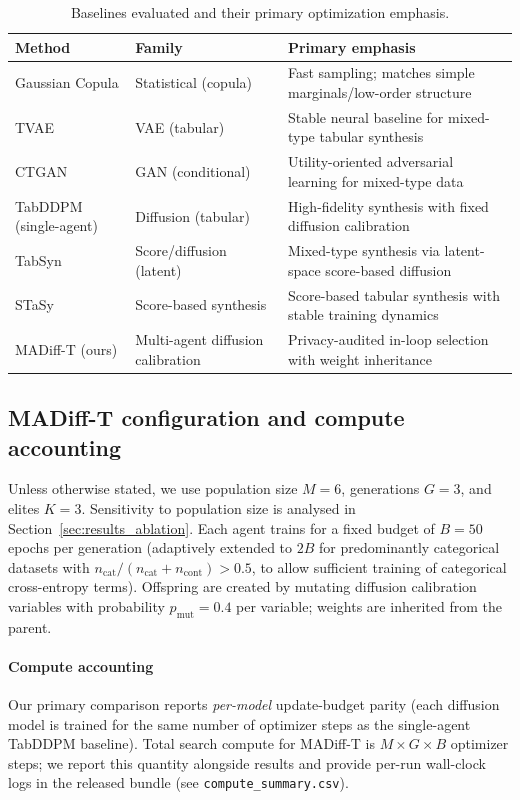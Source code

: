 \documentclass[preprint,12pt]{elsarticle}
\begin{document}
\begin{table}[t]
\centering
\caption{Baselines evaluated and their primary optimization emphasis.}
\label{tab:baselines}
\small
\setlength{\tabcolsep}{6pt}
\renewcommand{\arraystretch}{1.12}
\begin{tabular}{p{3.6cm} p{3.0cm} p{6.0cm}}
\toprule
\rowcolor{tablehead}
\textbf{Method} & \textbf{Family} & \textbf{Primary emphasis} \\
\midrule
Gaussian Copula \cite{Patki2016} & Statistical (copula) & Fast sampling; matches simple marginals/low-order structure \\
TVAE \cite{Xu2019b} & VAE (tabular) & Stable neural baseline for mixed-type tabular synthesis \\
CTGAN \cite{Xu2019a} & GAN (conditional) & Utility-oriented adversarial learning for mixed-type data \\
TabDDPM (single-agent) \cite{Kotelnikov2023} & Diffusion (tabular) & High-fidelity synthesis with fixed diffusion calibration \\
TabSyn \cite{Zhang2024} & Score/diffusion (latent) & Mixed-type synthesis via latent-space score-based diffusion \\
STaSy \cite{Kim2023} & Score-based synthesis & Score-based tabular synthesis with stable training dynamics \\
MADiff-T (ours) & Multi-agent diffusion calibration & Privacy-audited in-loop selection with weight inheritance \\
\bottomrule
\end{tabular}
\end{table}

\subsection{MADiff-T configuration and compute accounting}
Unless otherwise stated, we use population size $M=6$, generations 
$G=3$, and elites $K=3$. Sensitivity to population size is 
analysed in Section~\ref{sec:results_ablation}. Each agent trains for a fixed budget of $B=50$ epochs per generation (adaptively extended to $2B$ for predominantly categorical datasets with $n_{\text{cat}}/(n_{\text{cat}}+n_{\text{cont}}) > 0.5$, to allow sufficient training of categorical cross-entropy terms). Offspring are created by mutating diffusion calibration variables with probability $p_{\text{mut}}=0.4$ per variable; weights are inherited from the parent.

\paragraph{Compute accounting} Our primary comparison reports \emph{per-model} update-budget parity (each diffusion model is trained for the same number of optimizer steps as the single-agent TabDDPM baseline). Total search compute for MADiff-T is $M \times G \times B$ optimizer steps; we report this quantity alongside results and provide per-run wall-clock logs in the released bundle (see \texttt{compute\_summary.csv}).
\end{document}
